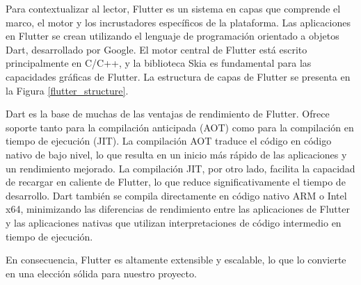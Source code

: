 Para contextualizar al lector, Flutter es un sistema en capas que comprende el marco, el motor y los incrustadores específicos de la plataforma. Las aplicaciones en Flutter se crean utilizando el lenguaje de programación orientado a objetos Dart, desarrollado por Google. El motor central de Flutter está escrito principalmente en C/C++, y la biblioteca Skia es fundamental para las capacidades gráficas de Flutter. La estructura de capas de Flutter se presenta en la Figura \ref{flutter_structure}.


Dart es la base de muchas de las ventajas de rendimiento de Flutter. Ofrece soporte tanto para la compilación anticipada (AOT) como para la compilación en tiempo de ejecución (JIT). La compilación AOT traduce el código en código nativo de bajo nivel, lo que resulta en un inicio más rápido de las aplicaciones y un rendimiento mejorado. La compilación JIT, por otro lado, facilita la capacidad de recargar en caliente de Flutter, lo que reduce significativamente el tiempo de desarrollo. Dart también se compila directamente en código nativo ARM o Intel x64, minimizando las diferencias de rendimiento entre las aplicaciones de Flutter y las aplicaciones nativas que utilizan interpretaciones de código intermedio en tiempo de ejecución.

En consecuencia, Flutter es altamente extensible y escalable, lo que lo convierte en una elección sólida para nuestro proyecto.


